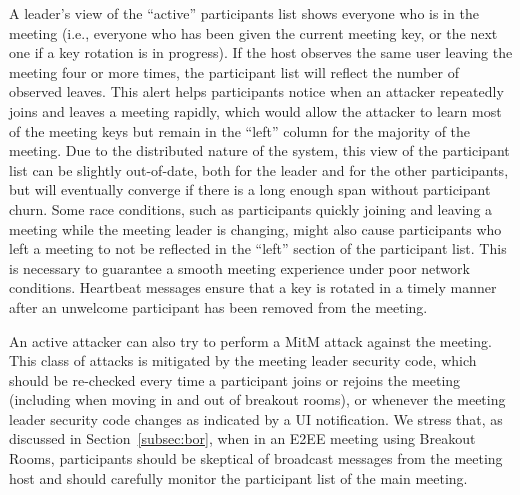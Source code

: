 A leader's view of the ``active'' participants list shows everyone who is in the meeting (i.e.,
everyone who has been given the current meeting key, or the next one if a key rotation is in
progress). If the host observes the same user leaving the meeting four or more times, the
participant list will reflect the number of observed leaves. This alert helps participants notice
when an attacker repeatedly joins and leaves a meeting rapidly, which would allow the attacker to
learn most of the meeting keys but remain in the ``left'' column for the majority of the meeting.
Due to the distributed nature of the system, this view of the participant list can be slightly
out-of-date, both for the leader and for the other participants, but will eventually converge if
there is a long enough span without participant churn. Some race conditions, such as participants
quickly joining and leaving a meeting while the meeting leader is changing, might also cause
participants who left a meeting to not be reflected in the ``left'' section of the participant list.
This is necessary to guarantee a smooth meeting experience under poor network conditions. Heartbeat
messages ensure that a key is rotated in a timely manner after an unwelcome participant has been
removed from the meeting.

An active attacker can also try to perform a MitM attack against the meeting. This class of attacks
is mitigated by the meeting leader security code, which should be re-checked every time a
participant joins or rejoins the meeting (including when moving in and out of breakout rooms), or
whenever the meeting leader security code changes as indicated by a UI notification. We stress that,
as discussed in Section~\ref{subsec:bor}, when in an E2EE meeting using Breakout Rooms, participants
should be skeptical of broadcast messages from the meeting host and should carefully monitor the
participant list of the main meeting.

